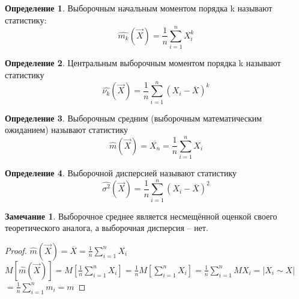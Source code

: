 \documentclass[a4paper, 12pt]{article}
\theoremstyle{definition}
\newtheorem{definition}{Определение}[section]
\theoremstyle{leads}
\theoremstyle{example}
\begin{document}
\begin{definition}
	Выборочным начальным моментом порядка k называют статистику:
	\begin{displaymath}
		\hat{m_k}(\vec{X}) = \frac{1}{n} \sum_{i=1}^{n} X_{i}^{k}
	\end{displaymath}
\end{definition}
\begin{definition}
	Центральным выборочным моментом порядка k называют статистику
	\begin{displaymath}
		\hat{\nu_k}(\vec{X}) = \frac{1}{n} \sum_{i=1}^{n} (X_i - \overline{X})^k
	\end{displaymath}
\end{definition}
\begin{definition}
	Выборочным средним (выборочным математическим ожиданием) называют статистику
	\begin{displaymath}
		\hat{m}(\vec{X}) = \overline{X_n} = \frac{1}{n}\sum_{i=1}^{n} X_i
	\end{displaymath}
\end{definition}
\begin{definition}
	Выборочной дисперсией называют статистику 
	\begin{displaymath}
		\hat{\sigma^2}(\vec{X}) = \frac{1}{n} \sum_{i=1}^{n} (X_i - \overline{X})^2
	\end{displaymath}
\end{definition}
\newtheorem*{remark}{Замечание}
\begin{remark}
	Выборочное среднее является несмещённой оценкой своего теоретического аналога, а выборочная дисперсия -- нет.
	\begin{proof}
		$\hat{m}(\vec{X}) = \overline{X} = \frac{1}{n} \sum_{i=1}^{n} X_i$\\
		$M[\hat{m}(\vec{X})] = M[\frac{1}{n} \sum_{i=1}^{n} X_i] = \frac{1}{n} M[\sum_{i=1}^{n}X_i] = \frac{1}{n} \sum_{i=1}^{n}MX_i = $|$X_i \sim X$| $ = \frac{1}{n} \sum_{i=1}^{n}m_i = m$
	\end{proof}
\end{remark}
\end{document}
